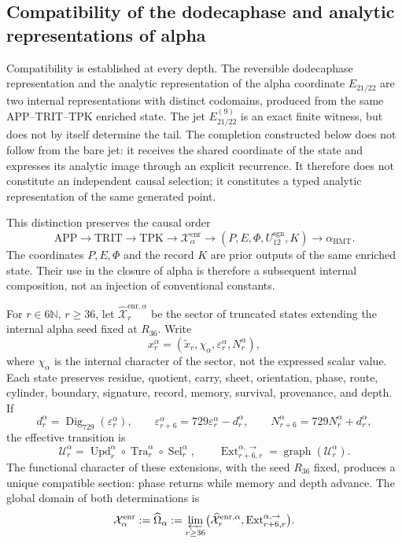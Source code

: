 \subsection{Compatibility of the dodecaphase and analytic representations of alpha}
\label{subsec:alpha-limite-dos-vias}

Compatibility is established at every depth. The reversible
dodecaphase representation and the analytic representation of the alpha
coordinate
\(E_{21/22}\) are two internal representations with distinct codomains,
produced from the same APP--TRIT--TPK enriched state. The jet
\(E_{21/22}^{(9)}\) is an exact finite witness, but does not by itself
determine the tail. The completion constructed below does not follow from
the bare jet: it receives the shared coordinate of the state and expresses
its analytic image through an explicit recurrence. It therefore does not
constitute an independent causal selection; it constitutes a typed analytic
representation of the same generated point.

This distinction preserves the causal order
\[
 \mathrm{APP}\longrightarrow\mathrm{TRIT}\longrightarrow\mathrm{TPK}
 \longrightarrow\mathcal X_{\alpha}^{\mathrm{enr}}
 \longrightarrow (P,E,\Phi,U_{12}^{\mathrm{sgn}},K)
 \longrightarrow\alpha_{\mathrm{HMT}}.
\]
The coordinates \(P,E,\Phi\) and the record \(K\) are prior outputs of the
same enriched state. Their use in the closure of alpha is therefore a
subsequent internal composition, not an injection of conventional
constants.

For \(r\in6\mathbb N\), \(r\ge36\), let
\(\widehat{\mathcal X}^{\mathrm{enr},\alpha}_r\) be the sector of truncated
states extending the internal alpha seed fixed at \(R_{36}\). Write
\[
 x_r^\alpha=(\widetilde x_r,\chi_\alpha,
              \varepsilon_r^\alpha,N_r^\alpha),
\]
where \(\chi_\alpha\) is the internal character of the sector, not the
expressed scalar value. Each state preserves residue, quotient, carry, sheet,
orientation, phase, route, cylinder, boundary, signature, record, memory,
survival, provenance, and depth. If
\[
 d_r^\alpha=\operatorname{Dig}_{729}(\varepsilon_r^\alpha),\qquad
 \varepsilon_{r+6}^\alpha=729\varepsilon_r^\alpha-d_r^\alpha,
 \qquad N_{r+6}^\alpha=729N_r^\alpha+d_r^\alpha,
\]
the effective transition is
\[
 \mathcal U_r^\alpha=
 \operatorname{Upd}_r^\alpha\circ
 \operatorname{Tra}_r^\alpha\circ
 \operatorname{Sel}_r^\alpha,
 \qquad
 \operatorname{Ext}^{\alpha,\to}_{r+6,r}
 =\operatorname{graph}(\mathcal U_r^\alpha).
\]
The functional character of these extensions, with the seed \(R_{36}\) fixed,
produces a unique compatible section: phase returns while memory and
depth advance. The global domain of both determinations is
\begin{equation}
 \mathcal X_\alpha^{\mathrm{enr}}:=\widehat\Omega_\alpha
 :=\varprojlim_{r\ge36}
 \bigl(\widehat{\mathcal X}^{\mathrm{enr},\alpha}_r,
       \operatorname{Ext}^{\alpha,\to}_{r+6,r}\bigr).
 \label{eq:alpha-dominio-enriquecido-completo}
\end{equation}

